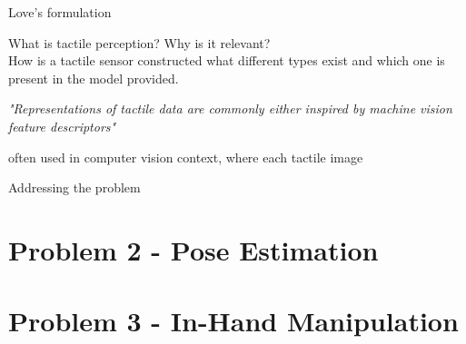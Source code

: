 








Love's formulation 




What is tactile perception? Why is it relevant? \\
How is a tactile sensor constructed \cite{recent-progress-in-technologies-for-tactile-sensors}
what different types exist and which one is present in the model provided.


\textit{"Representations of tactile data are commonly either inspired by machine vision feature descriptors"}

often used in computer vision context, where each tactile image 

Addressing the problem 





\section{Problem 2 - Pose Estimation} \label{sec:lit-rev-problem-2}

\section{Problem 3 - In-Hand Manipulation} \label{sec:lit-rev-problem-3}